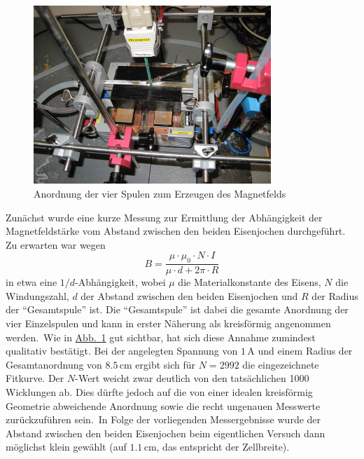 \documentclass[11pt]{scrartcl}
\newcommand{\unit}[1]{\ensuremath{\,\mathrm{#1}}} %
\begin{document}
\begin{figure}[ht]
\begin{center}
\includegraphics[width=0.8\textwidth]{images/bfeld-vor2.jpg}
\end{center}
\vspace{-1.5\baselineskip}
\caption{Anordnung der vier Spulen zum Erzeugen des Magnetfelds}
\label{bfeld-vor2}
\end{figure}

Zunächst wurde eine kurze Messung zur Ermittlung der Abhängigkeit der Magnetfeldstärke vom Abstand zwischen den beiden Eisenjochen
durchgeführt. Zu erwarten war wegen 
\begin{equation*}
B = \frac{\mu \cdot \mu_{0} \cdot N \cdot I}{\mu \cdot d + 2 \pi \cdot R}
\end{equation*}
in etwa eine $1/d$-Abhängigkeit, wobei $\mu$ die Materialkonstante des Eisens, $N$ die Windungszahl, $d$ der Abstand zwischen den beiden Eisenjochen und $R$ der Radius der "`Gesamtspule"' ist. Die "`Gesamtspule"' ist dabei die gesamte Anordnung der vier Einzelspulen und kann in erster Näherung als kreisförmig angenommen werden.\
Wie in \hyperref[bfeld-vor2]{Abb.~\ref{bfeld-vor2}} gut sichtbar, hat sich diese Annahme zumindest qualitativ bestätigt. Bei der angelegten Spannung von $1 \unit{A}$ und einem Radius der Gesamtanordnung von $8.5 \unit{cm}$ ergibt sich für $N=2992$ die eingezeichnete Fitkurve. Der $N$-Wert weicht zwar deutlich von den tatsächlichen 1000 Wicklungen ab. Dies dürfte jedoch auf die von einer idealen kreisförmig Geometrie abweichende Anordnung sowie die recht ungenauen Messwerte zurückzuführen sein.\ In Folge der vorliegenden Messergebnisse wurde der Abstand zwischen den beiden Eisenjochen beim eigentlichen Versuch dann möglichst klein gewählt (auf $1.1 \unit{cm}$, das entspricht der Zellbreite).
\end{document}
